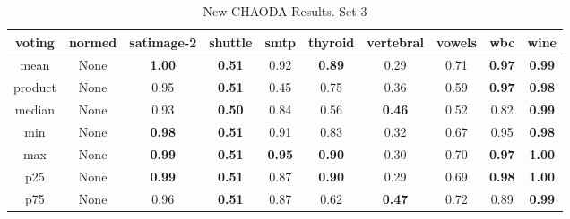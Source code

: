 \begin{table*}[!b]
    \renewcommand{\arraystretch}{1.25}
    \caption{New CHAODA Results. Set 3}
    \label{table:results:new-chaoda-3}
    \centering
    \begin{tabular}{|c|c|c|c|c|c|c|c|c|c|}
        \hline
        \textbf{voting} & \textbf{normed} & \textbf{\textbf{satimage-2}} & \textbf{\textbf{shuttle}} & \textbf{\textbf{smtp}} & \textbf{\textbf{thyroid}} & \textbf{\textbf{vertebral}} & \textbf{\textbf{vowels}} & \textbf{\textbf{wbc}} & \textbf{\textbf{wine}} \\
        \hline
                    mean &            None &                \textbf{1.00} &             \textbf{0.51} &                   0.92 &             \textbf{0.89} &                        0.29 &                     0.71 &         \textbf{0.97} &          \textbf{0.99} \\
        \hline
                product &            None &                         0.95 &             \textbf{0.51} &                   0.45 &                      0.75 &                        0.36 &                     0.59 &         \textbf{0.97} &          \textbf{0.98} \\
        \hline
                    median &            None &                         0.93 &             \textbf{0.50} &                   0.84 &                      0.56 &               \textbf{0.46} &                     0.52 &                  0.82 &          \textbf{0.99} \\
        \hline
                    min &            None &                \textbf{0.98} &             \textbf{0.51} &                   0.91 &                      0.83 &                        0.32 &                     0.67 &                  0.95 &          \textbf{0.98} \\
        \hline
                    max &            None &                \textbf{0.99} &             \textbf{0.51} &          \textbf{0.95} &             \textbf{0.90} &                        0.30 &                     0.70 &         \textbf{0.97} &          \textbf{1.00} \\
        \hline
                    p25 &            None &                \textbf{0.99} &             \textbf{0.51} &                   0.87 &             \textbf{0.90} &                        0.29 &                     0.69 &         \textbf{0.98} &          \textbf{1.00} \\
        \hline
                    p75 &            None &                         0.96 &             \textbf{0.51} &                   0.87 &                      0.62 &               \textbf{0.47} &                     0.72 &                  0.89 &          \textbf{0.99} \\

\end{tabular}
\end{table*}
